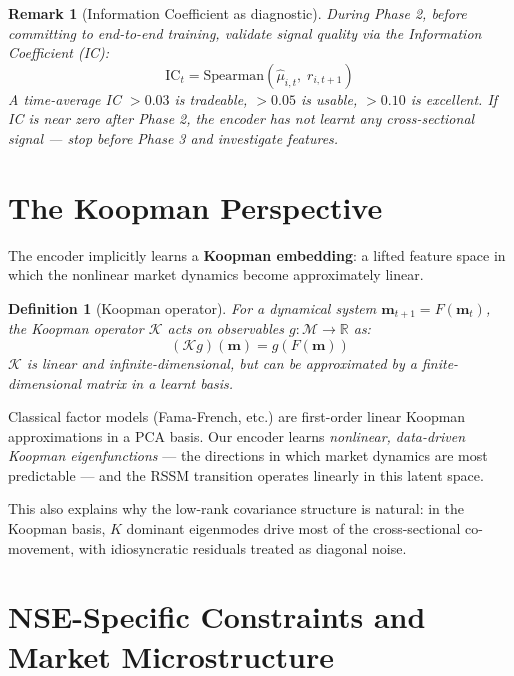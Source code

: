 \documentclass[11pt, a4paper]{article}
\newtheorem{remark}{Remark}
\newtheorem{definition}{Definition}
\begin{document}
\begin{remark}[Information Coefficient as diagnostic]
During Phase 2, before committing to end-to-end training, validate signal
quality via the \emph{Information Coefficient} (IC):
\[
  \text{IC}_t = \text{Spearman}\!\left(\hat{\mu}_{i,t},\; r_{i,t+1}\right)
\]
A time-average IC $> 0.03$ is tradeable, $> 0.05$ is usable, $> 0.10$ is
excellent.  If IC is near zero after Phase 2, the encoder has not learnt
any cross-sectional signal — stop before Phase 3 and investigate features.
\end{remark}

\section{The Koopman Perspective}

The encoder implicitly learns a \textbf{Koopman embedding}: a lifted feature
space in which the nonlinear market dynamics become approximately linear.

\begin{definition}[Koopman operator]
For a dynamical system $\mathbf{m}_{t+1} = F(\mathbf{m}_t)$, the Koopman
operator $\mathcal{K}$ acts on observables $g: \mathcal{M} \to \mathbb{R}$ as:
\[
  (\mathcal{K} g)(\mathbf{m}) = g(F(\mathbf{m}))
\]
$\mathcal{K}$ is linear and infinite-dimensional, but can be approximated by a
finite-dimensional matrix in a learnt basis.
\end{definition}

Classical factor models (Fama-French, etc.) are first-order linear Koopman
approximations in a PCA basis.  Our encoder learns \emph{nonlinear, data-driven
Koopman eigenfunctions} — the directions in which market dynamics are most
predictable — and the RSSM transition operates linearly in this latent space.

This also explains why the low-rank covariance structure is natural: in the
Koopman basis, $K$ dominant eigenmodes drive most of the cross-sectional
co-movement, with idiosyncratic residuals treated as diagonal noise.

\section{NSE-Specific Constraints and Market Microstructure}
\end{document}
